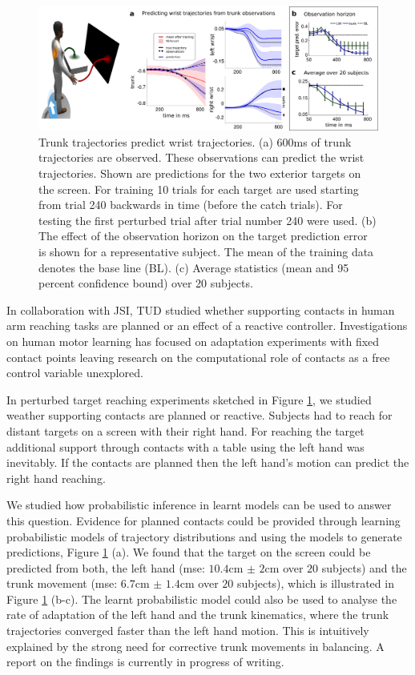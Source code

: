 \begin{figure}
\centering
\includegraphics[width=\linewidth]{images/SummaryFig_Y2Report.png}
\caption{Trunk trajectories predict wrist trajectories. (a) 600ms of trunk trajectories are observed. These observations can predict the wrist trajectories. Shown are predictions for the two exterior targets on the screen. For training 10 trials for each target are used starting from trial 240 backwards in time (before the catch trials). For testing the first perturbed trial after trial number 240 were used. (b) The effect of the observation horizon on the target prediction error is shown for a representative subject. The mean of the training data denotes the base line (BL). (c) Average statistics (mean and 95 percent confidence bound) over 20 subjects.
}
\label{fig:HumanProMPsPrediction}
\end{figure}

In collaboration with JSI, TUD studied whether supporting contacts in human arm reaching tasks are planned or an effect of a reactive controller. Investigations on human motor learning has focused on adaptation experiments with fixed contact points leaving research on the computational role of contacts as a free control variable unexplored.

In perturbed target reaching experiments sketched in Figure \ref{fig:HumanProMPsPrediction}, we studied weather supporting contacts are planned or reactive. Subjects had to reach for distant targets on a screen with their right hand. For reaching the target additional support through contacts with a table using the left hand was inevitably. If the contacts are planned then the left hand's motion can predict the right hand reaching.

We studied how probabilistic inference in learnt models can be used to answer this question. Evidence for planned contacts could be provided through learning probabilistic models of trajectory distributions and using the models to generate predictions, Figure \ref{fig:HumanProMPsPrediction} (a). We found that the target on the screen could be predicted from both, the left hand (mse: $10.4$cm $\pm$ $2$cm over $20$ subjects) and the trunk movement (mse: $6.7$cm $\pm$ $1.4$cm over $20$ subjects), which is illustrated in Figure \ref{fig:HumanProMPsPrediction} (b-c). The learnt probabilistic model could also be used to analyse the rate of adaptation of the left hand and the trunk kinematics, where the trunk trajectories converged faster than the left hand motion. This is intuitively explained by the strong need for corrective trunk movements in balancing. A report on the findings is currently in progress of writing.

